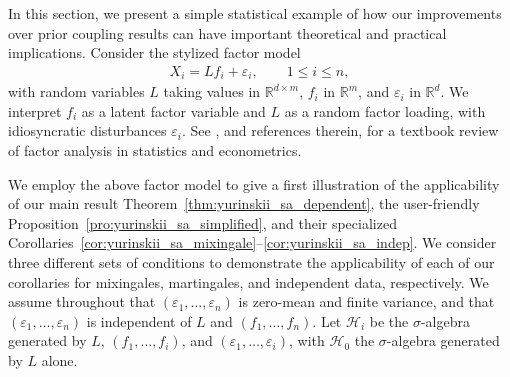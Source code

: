 \documentclass[11pt,lof]{puthesis}
\newcommand{\R}{\ensuremath{\mathbb{R}}}
\newcommand{\cH}{\ensuremath{\mathcal{H}}}
\theoremstyle{break}
\theoremstyle{proof}
\begin{document}
In this section, we present a simple statistical example of how our
improvements over prior coupling results can have important theoretical and
practical implications. Consider the stylized factor model
%
\begin{align*}
  X_i = L f_i + \varepsilon_i, \qquad 1 \leq i \leq n,
\end{align*}
%
with random variables $L$ taking values in $\R^{d \times m}$, $f_i$ in $\R^m$,
and $\varepsilon_i$ in $\R^d$. We interpret $f_i$ as a latent factor variable
and $L$ as a random factor loading, with idiosyncratic disturbances
$\varepsilon_i$. See \citet{fan2020statistical}, and references therein, for a
textbook review of factor analysis in statistics and econometrics.

We employ the above factor model to give a first illustration of the
applicability of our main result Theorem~\ref{thm:yurinskii_sa_dependent}, the
user-friendly Proposition~\ref{pro:yurinskii_sa_simplified}, and their
specialized
Corollaries~\ref{cor:yurinskii_sa_mixingale}--\ref{cor:yurinskii_sa_indep}. We
consider three different sets of conditions to demonstrate the applicability of
each of our corollaries for mixingales, martingales, and independent data,
respectively. We assume throughout that $(\varepsilon_1, \ldots, \varepsilon_n)$
is zero-mean and finite variance, and that $(\varepsilon_1, \ldots,
\varepsilon_n)$ is independent of $L$ and $(f_1, \ldots, f_n)$. Let $\cH_i$ be
the $\sigma$-algebra generated by $L$, $(f_1, \ldots, f_i)$, and
$(\varepsilon_1, \ldots, \varepsilon_i)$, with $\cH_0$ the $\sigma$-algebra
generated by $L$ alone.
\end{document}
